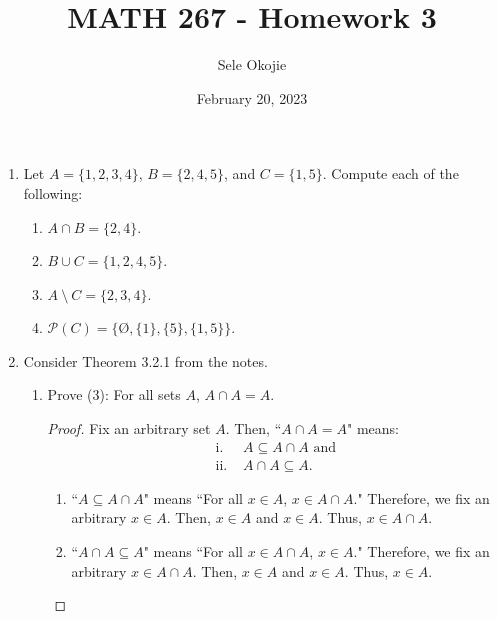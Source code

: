 \documentclass{article}
\title{MATH 267 - Homework 3}
\author{Sele Okojie}
\date{February 20, 2023}
\begin{document}
    \maketitle

    \begin{enumerate}
    	\item Let $A = \{ 1, 2, 3, 4 \}$, $B = \{ 2, 4, 5 \}$, and $C = \{ 1, 5 \}$.  Compute each of the following:
    		\begin{enumerate}

    			\item $A \cap B = \{2, 4 \}$.

    			\item $B \cup C = \{ 1, 2, 4, 5 \}$.

    			\item $A \ \setminus \ C = \{ 2, 3, 4 \}$.

    			\item $\mathcal{P}(C) = \{ \text{\O}, \{ 1 \}, \{ 5 \}, \{ 1, 5 \} \}$.
    		\end{enumerate}

    	\item Consider Theorem 3.2.1 from the notes.
    		\begin{enumerate}

    			\item Prove (3): For all sets $A$, $A \cap A = A$.
                        \begin{proof}
                            Fix an arbitrary set $A$. Then, ``$A \cap A = A$" means:
                            \begin{align*}
                                \text{i. } &A \subseteq A \cap A \text{ and} \\
                                \text{ii. } &A \cap A \subseteq A.
                            \end{align*}
                            
                            \begin{enumerate}
                                \item ``$A \subseteq A \cap A$" means ``For all $x \in A$, $x \in A \cap A$." Therefore, we fix an arbitrary $x \in A$. Then, $x \in A$ and $x \in A$. Thus, $x \in A \cap A$. \\
                                \item ``$A \cap A \subseteq A$" means ``For all $x \in A \cap A$, $x \in A$." Therefore, we fix an arbitrary $x \in A \cap A$. Then, $x \in A$ and $x \in A$. Thus, $x \in A$.
                            \end{enumerate}
                        \end{proof}


\end{enumerate}
\end{enumerate}
\end{document}
